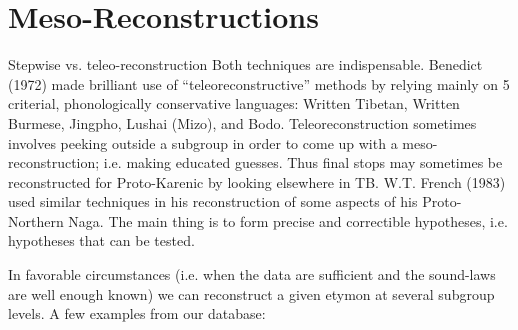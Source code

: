 \section{Meso-Reconstructions}

Stepwise vs. teleo-reconstruction
Both techniques are indispensable. Benedict (1972) made brilliant use of “teleoreconstructive” methods by relying mainly on 5 criterial, phonologically conservative languages: Written Tibetan, Written Burmese, Jingpho, Lushai (Mizo), and Bodo. Teleoreconstruction sometimes involves peeking outside a subgroup in order to come up with a meso-reconstruction; i.e. making educated guesses. Thus final stops may sometimes be reconstructed for Proto-Karenic by looking elsewhere in TB. W.T. French (1983) used similar techniques in his reconstruction of some aspects of his Proto-Northern Naga. The main thing is to form precise and correctible hypotheses, i.e. hypotheses that can be tested.

In favorable circumstances (i.e. when the data are sufficient and the sound-laws are well enough known) we can reconstruct a given etymon at several subgroup levels. A few examples from our database: 

